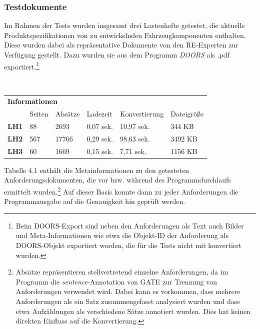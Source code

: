\documentclass[12pt]{report}
\begin{document}
\subsubsection{Testdokumente}
Im Rahmen der Tests wurden insgesamt drei Lastenhefte getestet, die aktuelle Produktspezifikationen von zu entwickelnden Fahrzeugkomponenten enthalten. Diese wurden dabei als repräsentative Dokumente von den RE-Experten zur Verfügung gestellt. Dazu wurden sie aus dem Programm \textit{DOORS} als .pdf exportiert.\footnote{Beim DOORS-Export sind neben den Anforderungen als Text auch Bilder und Meta-Informationen wie etwa die Objekt-ID der Anforderung als DOORS-Objekt exportiert worden, die für die Tests nicht mit konvertiert wurden.} 

\vspace{12pt}
\begin{table}[h!]
\tt
\begin{tabular}{llllll}
\multicolumn{6}{l}{\textbf{Informationen}}                                                                                                   \\
\multicolumn{1}{l|}{}             & Seiten & \multicolumn{1}{l|}{Absätze} & Ladezeit  & \multicolumn{1}{l|}{Konvertierung} & Dateigröße \\ \hline
\multicolumn{1}{l|}{\textbf{LH1}} & 88     & \multicolumn{1}{l|}{2693}    & 0,07 sek. & \multicolumn{1}{l|}{10,97 sek.}         & 344 KB     \\
\multicolumn{1}{l|}{\textbf{LH2}} & 567    & \multicolumn{1}{l|}{17766}   & 0,29 sek. & \multicolumn{1}{l|}{98,63 sek.}         & 3492 KB    \\
\multicolumn{1}{l|}{\textbf{LH3}} & 60     & \multicolumn{1}{l|}{1669}    & 0,15 sek. & \multicolumn{1}{l|}{7,71 sek.}          & 1156 KB   
\end{tabular}
\rm
{}
\end{table}
\vspace{12pt}

Tabelle 4.1 enthält die Metainformationen zu den getesteten Anforderungsdokumenten, die vor bzw. während des Programmdurchlaufs ermittelt wurden.\footnote{Absätze repräsentieren stellvertretend einzelne Anforderungen, da im Programm die \textit{sentence}-Annotation von GATE zur Trennung von Anforderungen verwendet wird. Dabei kann es vorkommen, dass mehrere Anforderungen als ein Satz zusammengefasst analysiert wurden und dass etwa Aufzählungen als verschiedene Sätze annotiert wurden. Dies hat keinen direkten Einfluss auf die Konvertierung.} Auf dieser Basis konnte dann zu jeder Anforderungen die Programmausgabe auf die Genauigkeit hin geprüft werden. 
\end{document}
